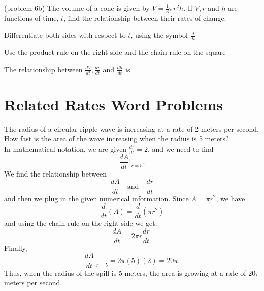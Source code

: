 \documentclass[handout]{ximera}
\begin{document}
\begin{problem}(problem 6b)
The volume of a cone is given by $V = \frac13 \pi r^2h$. If $V, r$ and $h$ are functions of time, $t$,
find the relationship between their rates of change.\\
\begin{hint}
Differentiate both sides with respect to $t$, using the symbol $\frac{d}{dt}$
\end{hint}
\begin{hint}
Use the product rule on the right side and the chain rule on the square
\end{hint}

The relationship between $\frac{dV}{dt}, \frac{dr}{dt}$ and $\frac{dh}{dt}$ is
\begin{multipleChoice}
\end{multipleChoice}
\end{problem}






\section{Related Rates Word Problems}




\begin{example}[example 7]
The radius of a circular ripple wave is increasing at a rate of 2 meters per second. How fast is the area of the wave 
increasing when the radius is 5 meters? \\
In mathematical notation, we are given $\frac{dr}{dt} = 2$, and we need to find
\[\frac{dA}{dt}\bigg|_{r = 5}.\]
We find the relationship between 
\[\frac{dA}{dt} \quad \text{and} \quad \frac{dr}{dt}\]
and then we plug in the given numerical information.
Since $A = \pi r^2$, we have
\[\frac{d}{dt} (A) = \frac{d}{dt}(\pi r^2)  \]
and using the chain rule on the right side we get:
\[\frac{dA}{dt}  = 2\pi r \frac{dr}{dt}.\]
Finally,
\[\frac{dA}{dt}\bigg|_{r = 5}  = 2\pi (5) (2) = 20\pi.\]
Thus, when the radius of the spill is 5 meters, the area is growing at a rate of $20\pi$ meters per second.
\end{example}
\end{document}
